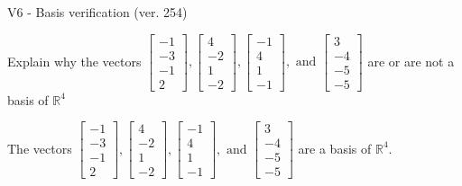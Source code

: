 \begin{exercise}
  \begin{exerciseTitle}V6 - Basis verification (ver. 254)\end{exerciseTitle}
  \begin{exerciseStatement}
    Explain why the vectors \(\left[\begin{array}{r}
-1 \\
-3 \\
-1 \\
2
\end{array}\right] , \left[\begin{array}{r}
4 \\
-2 \\
1 \\
-2
\end{array}\right] , \left[\begin{array}{r}
-1 \\
4 \\
1 \\
-1
\end{array}\right] , \text{ and } \left[\begin{array}{r}
3 \\
-4 \\
-5 \\
-5
\end{array}\right]\) are or are not a basis of \(\mathbb{R}^4\)	


  \end{exerciseStatement}
  \begin{exerciseAnswer}
   The vectors \(\left[\begin{array}{r}
-1 \\
-3 \\
-1 \\
2
\end{array}\right] , \left[\begin{array}{r}
4 \\
-2 \\
1 \\
-2
\end{array}\right] , \left[\begin{array}{r}
-1 \\
4 \\
1 \\
-1
\end{array}\right] , \text{ and } \left[\begin{array}{r}
3 \\
-4 \\
-5 \\
-5
\end{array}\right]\) 
  	 are  a basis of \(\mathbb{R}^4\).
  


  \end{exerciseAnswer}
\end{exercise}
